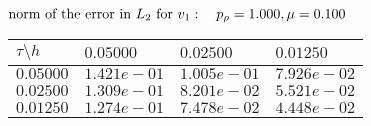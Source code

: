 $
 \text{norm of the error in $L_2$ for $v_1$}: \quad p_{\rho}=1.000, \mu = 0.100 \\ $
\begin{tabular}{|p{0.6in}|p{1.2in}|p{1.2in}|p{1.2in}|} \hline
$\tau\setminus h$ & $0.05000$ & $0.02500$& $0.01250$ \\ \hline
$0.05000$ & $1.421e-01$ &$1.005e-01$ &$7.926e-02$  \\ \hline
$0.02500$ & $1.309e-01$ &$8.201e-02$ &$5.521e-02$  \\ \hline
$0.01250$ & $1.274e-01$ &$7.478e-02$ &$4.448e-02$  \\ \hline
\end{tabular}\\[20pt]
